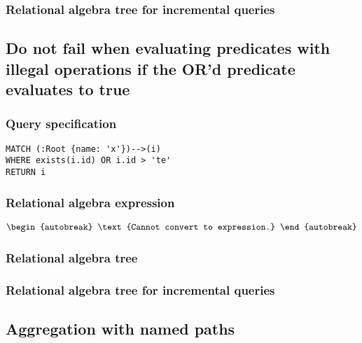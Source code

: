 
\subsubsection*{Relational algebra tree for incremental queries}


\subsection{Do not fail when evaluating predicates with illegal operations if the OR'd predicate evaluates to true}

\subsubsection*{Query specification}

\begin{lstlisting}
MATCH (:Root {name: 'x'})-->(i)
WHERE exists(i.id) OR i.id > 'te'
RETURN i
\end{lstlisting}

\subsubsection*{Relational algebra expression}

\begin{align*}
\begin{autobreak}
\text{Cannot convert to expression.}
\end{autobreak}
\end{align*}

\subsubsection*{Relational algebra tree}


\subsubsection*{Relational algebra tree for incremental queries}


\subsection{Aggregation with named paths}

